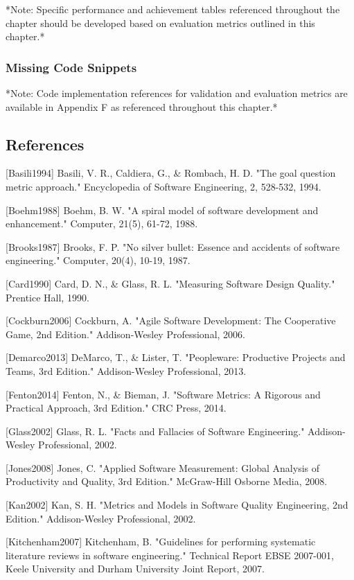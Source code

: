 \documentclass[12pt,a4paper]{article}
\begin{document}
*Note: Specific performance and achievement tables referenced throughout the chapter should be developed based on
evaluation metrics outlined in this chapter.*

\subsubsection{Missing Code Snippets}

*Note: Code implementation references for validation and evaluation metrics are available in Appendix F as referenced
throughout this chapter.*

\subsection{References}

[Basili1994] Basili, V. R., Caldiera, G., \& Rombach, H. D. "The goal question metric approach." Encyclopedia of Software
Engineering, 2, 528-532, 1994.

[Boehm1988] Boehm, B. W. "A spiral model of software development and enhancement." Computer, 21(5), 61-72, 1988.

[Brooks1987] Brooks, F. P. "No silver bullet: Essence and accidents of software engineering." Computer, 20(4), 10-19,
1987.

[Card1990] Card, D. N., \& Glass, R. L. "Measuring Software Design Quality." Prentice Hall, 1990.

[Cockburn2006] Cockburn, A. "Agile Software Development: The Cooperative Game, 2nd Edition." Addison-Wesley
Professional, 2006.

[Demarco2013] DeMarco, T., \& Lister, T. "Peopleware: Productive Projects and Teams, 3rd Edition." Addison-Wesley
Professional, 2013.

[Fenton2014] Fenton, N., \& Bieman, J. "Software Metrics: A Rigorous and Practical Approach, 3rd Edition." CRC Press,
2014.

[Glass2002] Glass, R. L. "Facts and Fallacies of Software Engineering." Addison-Wesley Professional, 2002.

[Jones2008] Jones, C. "Applied Software Measurement: Global Analysis of Productivity and Quality, 3rd Edition."
McGraw-Hill Osborne Media, 2008.

[Kan2002] Kan, S. H. "Metrics and Models in Software Quality Engineering, 2nd Edition." Addison-Wesley Professional,
2002.

[Kitchenham2007] Kitchenham, B. "Guidelines for performing systematic literature reviews in software engineering."
Technical Report EBSE 2007-001, Keele University and Durham University Joint Report, 2007.
\end{document}
